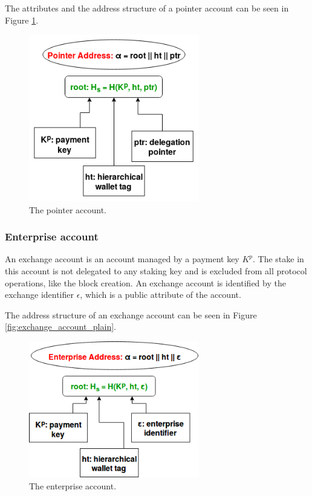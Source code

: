 The attributes and the address structure of a pointer account can be seen in Figure \ref{fig:pointer_account}.

\begin{figure}
  \begin{center}
    \includegraphics[width=210pt]{figures/pointer_account.png}
  \end{center}
  \caption{The pointer account.}
  \label{fig:pointer_account}
\end{figure}

\subsubsection{Enterprise account}\label{subsubsec:exchange_account_plain}

An exchange account is an account managed by a payment key $K^p$. The stake in this account is not delegated to any staking key and is excluded from all protocol operations, like the block creation. An exchange account is identified by the exchange identifier $\epsilon$, which is a public attribute of the account.

The address structure of an exchange account can be seen in Figure \ref{fig:exchange_account_plain}.

\begin{figure}
  \begin{center}
    \includegraphics[width=210pt]{figures/enterprise_account_plain.png}
  \end{center}
  \caption{The enterprise account.}
  \label{fig:enterprise_account_plain}
\end{figure}
